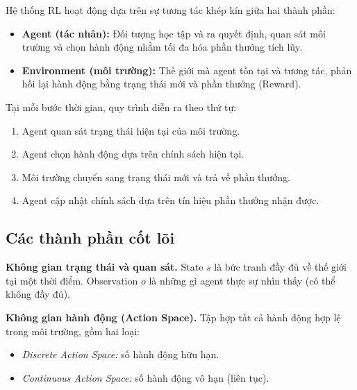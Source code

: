 Hệ thống RL hoạt động dựa trên sự tương tác khép kín giữa hai thành phần:
\begin{itemize}
    \item \textbf{Agent (tác nhân):} Đối tượng học tập và ra quyết định, quan
    sát môi trường và chọn hành động nhằm tối đa hóa phần thưởng tích lũy.
    \item \textbf{Environment (môi trường):} Thế giới mà agent tồn tại và tương
    tác, phản hồi lại hành động bằng trạng thái mới và phần thưởng (Reward).
\end{itemize}

Tại mỗi bước thời gian, quy trình diễn ra theo thứ tự:
\begin{enumerate}
    \item Agent quan sát trạng thái hiện tại của môi trường.
    \item Agent chọn hành động dựa trên chính sách hiện tại.
    \item Môi trường chuyển sang trạng thái mới và trả về phần thưởng.
    \item Agent cập nhật chính sách dựa trên tín hiệu phần thưởng nhận được.
\end{enumerate}

\subsection{Các thành phần cốt lõi}

\textbf{Không gian trạng thái và quan sát.}
State $s$ là bức tranh đầy đủ về thế giới tại một thời điểm.
Observation $o$ là những gì agent thực sự nhìn thấy (có thể không đầy đủ).

\textbf{Không gian hành động (Action Space).}
Tập hợp tất cả hành động hợp lệ trong môi trường, gồm hai loại:
\begin{itemize}
    \item \textit{Discrete Action Space:} số hành động hữu hạn.
    \item \textit{Continuous Action Space:} số hành động vô hạn (liên tục).
\end{itemize}


